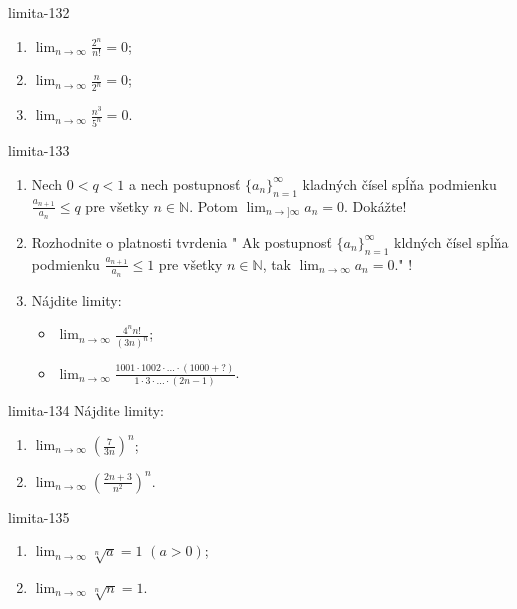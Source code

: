 \begin{defproblem}{limita-132}
\begin{enumerate}
\item $\lim_{n \rightarrow \infty} \frac{2^n}{n!}=0$;
\item $\lim_{n \rightarrow \infty} \frac{n}{2^n}=0$;
\item $\lim_{n \rightarrow \infty} \frac{n^3}{5^n}=0$.
\end{enumerate}
\end{defproblem}

\begin{defproblem}{limita-133}
\begin{enumerate}
\item Nech $0<q<1$ a nech postupnosť ${\{a_n\}}_{n=1}^\infty$ kladných čísel spĺňa podmienku $\frac{a_{n+1}}{a_{n}} \leq q$ pre všetky $n \in \mathbb{N}$. Potom $\lim_{n \rightarrow] \infty} a_n=0$. Dokážte!
\item Rozhodnite o platnosti tvrdenia " Ak postupnosť ${\{a_n\}}_{n=1}^\infty$ kldných čísel spĺňa podmienku $\frac{a_{n+1}}{a_{n}} \leq 1$ pre všetky $n \in \mathbb{N}$, tak $\lim_{n \rightarrow \infty} a_n=0$." !
\item Nájdite limity:
\begin{itemize}
\item $\lim_{n \rightarrow \infty} \frac{4^n n!}{(3n)^n}$;
\item $\lim_{n \rightarrow \infty} \frac{1001 \cdot 1002 \cdot ... \cdot (1000+?)}{1 \cdot 3 \cdot ... \cdot (2n-1)}$.
\end{itemize}
\end{enumerate}
\end{defproblem}

\begin{defproblem}{limita-134}
Nájdite limity:
\begin{enumerate}
\item $\lim_{n \rightarrow \infty} (\frac{7}{3n})^n$;
\item $\lim_{n \rightarrow \infty} (\frac{2n+3}{n^2})^n$.
\end{enumerate}
\end{defproblem}

\begin{defproblem}{limita-135}
\begin{enumerate}
\item $\lim_{n \rightarrow \infty} \sqrt[n]{a}=1$  $(a>0)$;
\item $\lim_{n \rightarrow \infty} \sqrt[n]{n}=1$.
\end{enumerate}
\end{defproblem}

